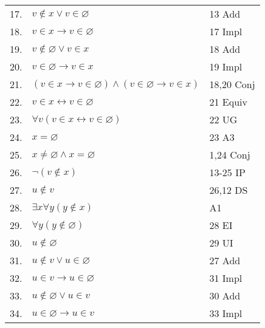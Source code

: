\documentclass[12pt, a4paper]{article}
\begin{document}
\begin{table}[h!]
\begin{center}
\begin{tabular}{l l l}
      17.& \hspace{20mm}$v\notin x\vee v\in\varnothing$ & 13 Add\\
      18.& \hspace{20mm}$v\in x\rightarrow v\in\varnothing$ & 17 Impl\\
      19.& \hspace{20mm}$v\notin\varnothing\vee v\in x$ & 18 Add\\
      20.& \hspace{20mm}$v\in\varnothing\rightarrow v\in x$ & 19 Impl\\
      21.& \hspace{20mm}$(v\in x\rightarrow v\in\varnothing)\wedge(v\in\varnothing\rightarrow v\in x)$ & 18,20 Conj\\
      22.& \hspace{20mm}$v\in x\leftrightarrow v\in\varnothing$ & 21 Equiv\\
      23.& \hspace{20mm}$\forall v(v\in x\leftrightarrow v\in\varnothing)$ & 22 UG\\
      24.& \hspace{20mm}$x=\varnothing$ & 23 A3\\
      25.& \hspace{20mm}$x\neq\varnothing\wedge x=\varnothing$ & 1,24 Conj\\
      26.& \hspace{10mm}$\neg(v\notin x)$ & 13-25 IP\\
      27.& \hspace{10mm}$u\notin v$ & 26,12 DS\\
      28.& \hspace{10mm}$\exists x\forall y(y\notin x)$ & A1\\
      29.& \hspace{10mm}$\forall y(y\notin\varnothing)$ & 28 EI\\
      30.& \hspace{10mm}$u\notin\varnothing$ & 29 UI\\
      31.& \hspace{10mm}$u\notin v\vee u\in\varnothing$ & 27 Add\\
      32.& \hspace{10mm}$u\in v\rightarrow u\in\varnothing$ & 31 Impl\\
      33.& \hspace{10mm}$u\notin\varnothing\vee u\in v$ & 30 Add\\
      34.& \hspace{10mm}$u\in\varnothing\rightarrow u\in v$ & 33 Impl\\

\end{tabular}
\end{center}
\end{table}
\end{document}
